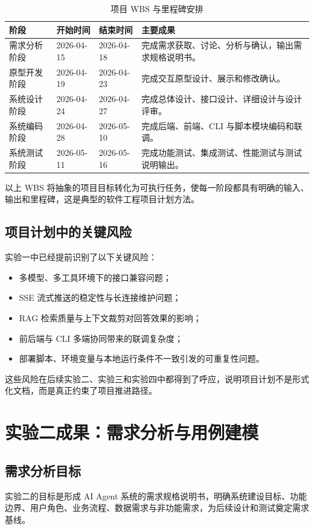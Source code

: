 \documentclass[12pt,a4paper,UTF8]{ctexart}
\begin{document}
\begin{table}[H]
    \centering
    \caption{项目 WBS 与里程碑安排}
    \label{tab:wbs}
    \begin{tabular}{p{2.3cm}p{2cm}p{2cm}p{6cm}}
        \toprule
        阶段 & 开始时间 & 结束时间 & 主要成果 \\
        \midrule
        需求分析阶段 & 2026-04-15 & 2026-04-18 & 完成需求获取、讨论、分析与确认，输出需求规格说明书。 \\
        原型开发阶段 & 2026-04-19 & 2026-04-23 & 完成交互原型设计、展示和修改确认。 \\
        系统设计阶段 & 2026-04-24 & 2026-04-27 & 完成总体设计、接口设计、详细设计与设计评审。 \\
        系统编码阶段 & 2026-04-28 & 2026-05-10 & 完成后端、前端、CLI 与脚本模块编码和联调。 \\
        系统测试阶段 & 2026-05-11 & 2026-05-16 & 完成功能测试、集成测试、性能测试与测试说明输出。 \\
        \bottomrule
    \end{tabular}
\end{table}

以上 WBS 将抽象的项目目标转化为可执行任务，使每一阶段都具有明确的输入、输出和里程碑，这是典型的软件工程项目计划方法。

\subsection{项目计划中的关键风险}
实验一中已经提前识别了以下关键风险：
\begin{itemize}
    \item 多模型、多工具环境下的接口兼容问题；
    \item SSE 流式推送的稳定性与长连接维护问题；
    \item RAG 检索质量与上下文裁剪对回答效果的影响；
    \item 前后端与 CLI 多端协同带来的联调复杂度；
    \item 部署脚本、环境变量与本地运行条件不一致引发的可重复性问题。
\end{itemize}

这些风险在后续实验二、实验三和实验四中都得到了呼应，说明项目计划不是形式化文档，而是真正约束了项目推进路径。

\section{实验二成果：需求分析与用例建模}

\subsection{需求分析目标}
实验二的目标是形成 AI Agent 系统的需求规格说明书，明确系统建设目标、功能边界、用户角色、业务流程、数据需求与非功能需求，为后续设计和测试奠定需求基线。
\end{document}

